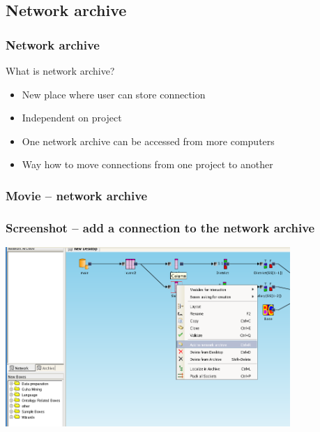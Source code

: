 \documentclass{beamer}
\begin{document}
\subsection{Network archive}
\begin{frame}
	\frametitle{Network archive}
	\begin{block}{What is network archive?}
		\begin{itemize}[<+->]
			\item New place where user can store connection
			\item Independent on project
			\item One network archive can be accessed from more computers
			\item Way how to move connections from one project to another
		\end{itemize}
	\end{block}
\end{frame}

\begin{frame}
	\frametitle{Movie -- network archive}
\end{frame}

\begin{frame}
	\frametitle{Screenshot -- add a connection to the network archive}
	\includegraphics[width=10.8cm]{add_to_network_archive}
\end{frame}
\end{document}
